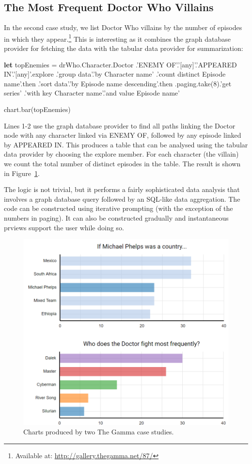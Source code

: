 \documentclass[manuscript,review,anonymous]{acmart}
\newcommand{\kvd}[1]{\textbf{#1}}
\newcommand{\ikvd}[1]{{\fontfamily{zi4}\selectfont\small #1}}
\begin{document}
\subsection{The Most Frequent Doctor Who Villains}
In the second case study, we list Doctor Who villains by the number of episodes in which they
appear.\footnote{Available at: \url{http://gallery.thegamma.net/87/}} This is interesting as it
combines the graph database provider for fetching the data with the tabular data provider for
summarization:

\begin{thegamma}
\kvd{let} topEnemies = drWho.Character.Doctor
  .'ENEMY OF'.'[any]'.'APPEARED IN'.'[any]'.explore
  .'group data'.'by Character name'
    .'count distinct Episode name'.then
  .'sort data'.'by Episode name descending'.then
  .paging.take(8).'get series'
    .'with key Character name'.'and value Episode name'

chart.bar(topEnemies)
\end{thegamma}

Lines 1-2 use the graph database provider to find all paths linking the Doctor node with any
character linked via \ikvd{ENEMY OF}, followed by any episode linked by \ikvd{APPEARED IN}.
This produces a table that can be analysed using the tabular data provider by choosing the
\ikvd{explore} member. For each character (the villain) we count the total number of
distinct episodes in the table. The result is shown in Figure~\ref{fig:cases}.

The logic is not trivial, but it performs a fairly sophisticated data analysis that involves a
graph database query followed by an SQL-like data aggregation. The code can be constructed
using iterative prompting (with the exception of the numbers in paging). It can also be constructed
gradually and instantaneous prviews support the user while doing so.

\begin{figure}
\centering
\includegraphics[width=1\columnwidth]{figures/cases}
\caption{Charts produced by two The Gamma case studies.}
\label{fig:cases}
\end{figure}
\end{document}
